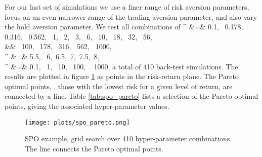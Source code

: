 \documentclass[openany]{now}
\begin{document}
For our last set of simulations
we use a finer range of risk aversion parameters,
focus on an even narrower range of the trading aversion parameter,
and also vary the hold aversion parameter.
We test all combinations of
\BEAS
\gamma^ &=& 0.1, ~0.178,~ 0.316, ~0.562, ~1, ~2, ~3, ~6, ~10, ~18, ~32, ~56,\\
&& \qquad ~100, ~178, ~316, ~562, ~1000,\\
\gamma^ &=& 5.5, ~6,~6.5,~7,~7.5,~8,\\
\gamma^ &=& 0.1, ~1, ~10,~ 100, ~ 1000,
\EEAS
a total of 410 back-test simulations.
The results are plotted in
figure \ref{fig:spo-pareto} as points in the risk-return plane.
The Pareto optimal points, \ie, those with the lowest risk
for a given level of return, are connected by a line.
Table \ref{tab:spo_pareto} lists a selection of the Pareto optimal points,
giving the associated hyper-parameter values.
\begin{figure}
\begin{center}
\texttt{[image: plots/spo\_pareto.png]}
\end{center}
\caption{SPO example, grid search over 410 hyper-parameter combinations.
The line connects the Pareto optimal points.}
\label{fig:spo-pareto}
\end{figure}
\end{document}
